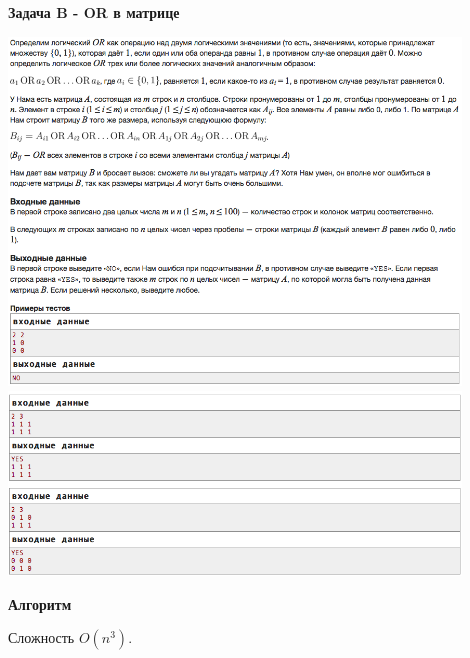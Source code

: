 \documentclass[a4paper,12pt]{article}
\begin{document}
\newpage
\textbf{{\large Задача B - OR в матрице}} \\
\begin{center}
\includegraphics[width=0.9\textwidth]{C_277/C_277_B1.png}\\
\includegraphics[width=0.9\textwidth]{C_277/C_277_B2.png}\\ [1cm]
\end{center}

\textbf{{\large Алгоритм}}

Сложность $O(n^3)$.
\end{document}
